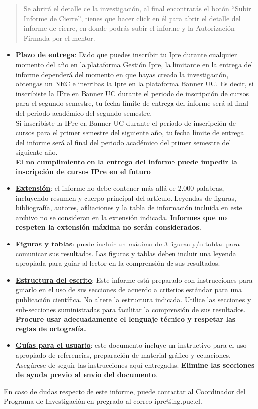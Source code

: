\begin{quote}
Se abrirá el detalle de la investigación, al final encontrarás el botón ``Subir Informe de Cierre'', tienes que hacer click en él para abrir el detalle del informe de cierre, en donde podrás subir el informe y la Autorización Firmada por el mentor.
\end{quote}


\begin{itemize}
  \item \underline{\textbf{Plazo de entrega}}: Dado que puedes inscribir tu Ipre durante cualquier momento del año en la plataforma Gestión Ipre, la limitante en la entrega del informe dependerá del momento en que hayas creado la investigación, obtengas un NRC e inscribas la Ipre en la plataforma Banner UC.
   Es decir, si inscribiste la IPre en Banner UC durante el periodo de inscripción de cursos para el segundo semestre, tu fecha límite de entrega del informe será al final del periodo académico del segundo semestre.\\
    Si inscribiste la IPre en Banner UC durante el periodo de inscripción de cursos para el primer semestre del siguiente año, tu fecha límite de entrega del informe será al final del periodo académico del primer semestre del siguiente año.\\
    \textbf{El no cumplimiento en la entrega del informe puede impedir la inscripción de cursos IPre en el futuro}


  \item\underline{\textbf{Extensión}}: el informe no debe contener más allá de 2.000 palabras, incluyendo resumen y cuerpo principal del artículo. Leyendas de figuras, bibliografía, autores, afiliaciones y la tabla de información incluida en este archivo no se consideran en la extensión indicada. \textbf{Informes que no respeten la extensión máxima no serán considerados}.
  \item\underline{\textbf{Figuras y tablas}}: puede incluir un máximo de 3 figuras y/o tablas para comunicar sus resultados. Las figuras y tablas deben incluir una leyenda apropiada para guiar al lector en la comprensión de sus resultados.
  \item\underline{\textbf{Estructura del escrito}}: Este informe está preparado con instrucciones para guiarlo en el uso de sus secciones de acuerdo a criterios estándar para una publicación científica. No altere la estructura indicada. Utilice las secciones y sub-secciones suministradas para facilitar la comprensión de sus resultados. \textbf{Procure usar adecuadamente el lenguaje técnico y respetar las reglas de ortografía.}
  \item\underline{\textbf{Guías para el usuario}}: este documento incluye un instructivo para el uso apropiado de referencias, preparación de material gráfico y ecuaciones. Asegúrese de seguir las instrucciones aquí entregadas. \textbf{Elimine las secciones de ayuda previo al envío del documento}.
\end{itemize}

En caso de dudas respecto de este informe, puede contactar al Coordinador del Programa de Investigación en pregrado al correo ipre@ing.puc.cl.

\newpage
